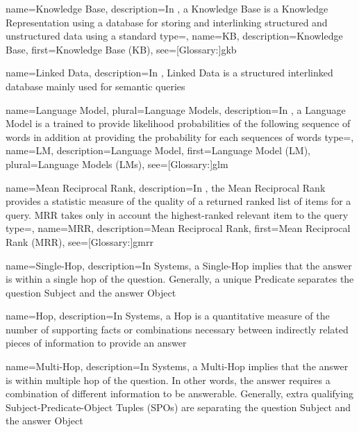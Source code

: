 {
  name={Knowledge Base},
  description={In , a Knowledge Base is a Knowledge Representation using a  database for storing and interlinking structured and unstructured data using a standard}
}
{
  type=\acronymtype,
  name={KB},
  description={Knowledge Base},
  first={Knowledge Base (KB)},
  see=[Glossary:]{gkb}
}


{
  name={Linked Data},
  description={In , Linked Data is a structured interlinked database mainly used for semantic queries}
}

{
  name={Language Model},
  plural={Language Models},
  description={In , a Language Model is a  trained to provide likelihood probabilities of the following sequence of words in addition at providing the probability for each sequences of words}
}
{
  type=\acronymtype,
  name={LM},
  description={Language Model},
  first={Language Model (LM)},
  plural={Language Models (LMs)},
  see=[Glossary:]{glm}
}

{
  name={Mean Reciprocal Rank},
  description={In , the Mean Reciprocal Rank provides a statistic measure of the quality of a returned ranked list of items for a query. MRR takes only in account the highest-ranked relevant item to the query}
}
{
  type=\acronymtype,
  name={MRR},
  description={Mean Reciprocal Rank},
  first={Mean Reciprocal Rank (MRR)},
  see=[Glossary:]{gmrr}
}


{
  name={Single-Hop},
  description={In  Systems, a Single-Hop implies that the answer is within a single \gls{hop} of the question. Generally, a unique Predicate separates the question Subject and the answer Object}
}

{
  name={Hop},
  description={In  Systems, a Hop is a quantitative measure of the number of supporting facts or combinations necessary between indirectly related pieces of information to provide an answer}
}


{
  name={Multi-Hop},
  description={In  Systems, a Multi-Hop implies that the answer is within multiple \gls{hop} of the question. In other words, the answer requires a combination of different information to be answerable. Generally, extra qualifying Subject-Predicate-Object Tuples (SPOs) are separating the question Subject and the answer Object}
}

